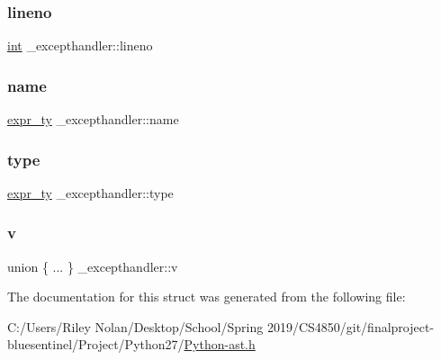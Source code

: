 \mbox{\label{struct__excepthandler_af779ad209161de4fa7e27838cc5f7fa3}} 
\subsubsection{\texorpdfstring{lineno}{lineno}}
{\footnotesize\ttfamily \mbox{\hyperlink{warnings_8h_a74f207b5aa4ba51c3a2ad59b219a423b}{int}} \+\_\+excepthandler\+::lineno}

\mbox{\label{struct__excepthandler_aebea8c76989a2c2750bb709c58c3d1b4}} 
\subsubsection{\texorpdfstring{name}{name}}
{\footnotesize\ttfamily \mbox{\hyperlink{_python-ast_8h_a56d3705e020a071405094a220c4592bd}{expr\+\_\+ty}} \+\_\+excepthandler\+::name}

\mbox{\label{struct__excepthandler_a71d56e01ee76537a4165e0318206d562}} 
\subsubsection{\texorpdfstring{type}{type}}
{\footnotesize\ttfamily \mbox{\hyperlink{_python-ast_8h_a56d3705e020a071405094a220c4592bd}{expr\+\_\+ty}} \+\_\+excepthandler\+::type}

\mbox{\label{struct__excepthandler_a9bf0c98d77da53e277fd43658981672d}} 
\subsubsection{\texorpdfstring{v}{v}}
{\footnotesize\ttfamily union \{ ... \}   \+\_\+excepthandler\+::v}



The documentation for this struct was generated from the following file\+:\begin{DoxyCompactItemize}
\item 
C\+:/\+Users/\+Riley Nolan/\+Desktop/\+School/\+Spring 2019/\+C\+S4850/git/finalproject-\/bluesentinel/\+Project/\+Python27/\mbox{\hyperlink{_python-ast_8h}{Python-\/ast.\+h}}\end{DoxyCompactItemize}
